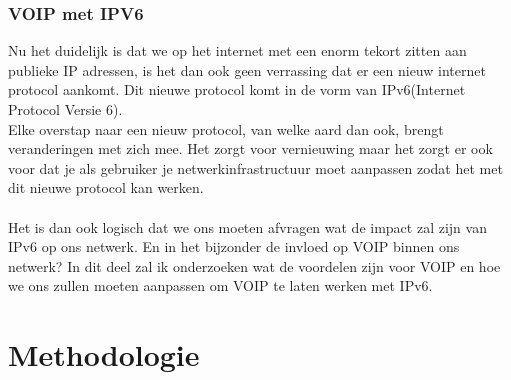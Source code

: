 \documentclass[pdftex,a4paper,12pt,twoside]{report}
\begin{document}
 
\subsection{VOIP met IPV6}
	
 Nu het duidelijk is dat we op het internet met een enorm tekort zitten aan publieke IP adressen, is het dan ook geen verrassing dat er een nieuw internet protocol aankomt. Dit nieuwe protocol komt in de vorm van IPv6(Internet Protocol Versie 6). \\
Elke overstap naar een nieuw protocol, van welke aard dan ook, brengt veranderingen met zich mee. Het zorgt voor vernieuwing maar het zorgt er ook voor dat je als gebruiker je netwerkinfrastructuur moet aanpassen zodat het met dit nieuwe protocol kan werken. 
\\ \\
Het is dan ook logisch dat we ons moeten afvragen wat de impact zal zijn van IPv6 op ons netwerk. En in het bijzonder de invloed op VOIP binnen ons netwerk? In dit deel zal ik onderzoeken wat de voordelen zijn voor VOIP en hoe we ons zullen moeten aanpassen om VOIP te laten werken met IPv6.
\newpage


\chapter{Methodologie}
\label{ch:methodologie}
\end{document}
